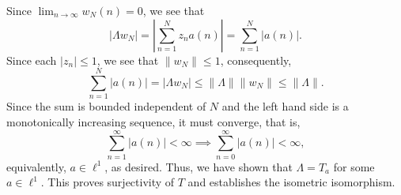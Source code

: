 \documentclass[10pt]{amsart}
\theoremstyle{thmstyle}
\theoremstyle{defstyle}
\renewcommand{\le}{\leqslant}
\begin{document}
Since $\lim_{n\to\infty} w_N(n) = 0$, we see that 
\begin{equation*}
	|\Lambda w_N| = \left|\sum_{n = 1}^N z_na(n)\right| = \sum_{n = 1}^N |a(n)|.
\end{equation*}
Since each $|z_n|\le 1$, we see that $\|w_N\|\le 1$, consequently, 
\begin{equation*}
	\sum_{n = 1}^N |a(n)| = |\Lambda w_N|\le \|\Lambda\|\|w_N\|\le \|\Lambda\|.
\end{equation*}
Since the sum is bounded independent of $N$ and the left hand side is a monotonically increasing sequence, it must converge, that is, 
\begin{equation*}
	\sum_{n = 1}^\infty |a(n)| < \infty\implies\sum_{n = 0}^\infty |a(n)| < \infty,
\end{equation*}
equivalently, $a\in\ell^1$, as desired. Thus, we have shown that $\Lambda = T_a$ for some $a\in\ell^1$. This proves surjectivity of $T$ and establishes the isometric isomorphism.
\end{document}
